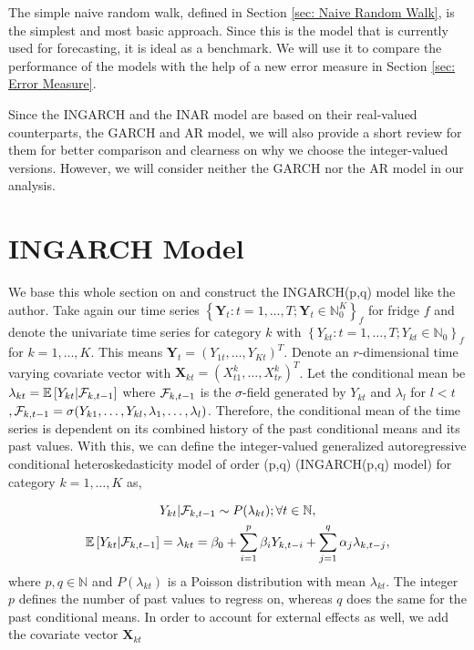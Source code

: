 The simple naive random walk, defined in Section \ref{sec: Naive Random Walk}, is the simplest and most basic approach. Since this is the model that is currently used for forecasting, it is ideal as a benchmark. We will use it to compare the performance of the models with the help of a new error measure in Section \ref{sec: Error Measure}. 

Since the INGARCH and the INAR model are based on their real-valued counterparts, the GARCH and AR model, we will also provide a short review for them for better comparison and clearness on why we choose the integer-valued versions. However, we will consider neither the GARCH nor the AR model in our analysis. 

\section{INGARCH Model}
\label{sec:Ingarch}

We base this whole section on \textcite{Liboschik:2016} and construct the INGARCH(p,q) model like the author. 
Take again our time series $\left\{\bm{Y}_t:t=1,\ldots,T; \bm{Y}_t \in \mathbb{N}_0^K \right\}_f$ for fridge $f$ and denote the univariate time series for category $k$ with $\left\{Y_{kt}:t=1,\ldots,T; Y_{kt} \in \mathbb{N}_0\right\}_f$  for $k=1,\ldots,K$. This means $\bm{Y}_t = (Y_{1t},\ldots,Y_{Kt})^T$. Denote an $r$-dimensional time varying covariate vector with $\textbf{X}_{kt}=(X_{t1}^k,\ldots,X_{tr}^k)^T$. Let the conditional mean be $\lambda_{kt} = \mathbb{E}\left[Y_{kt} | \mathcal{F}_{k,t-1} \right]$ where $\mathcal{F}_{k,t-1}$ is the $\sigma$-field generated by $Y_{kt}$ and $\lambda_l$ for $l<t$ $, \mathcal{F} _{k,t-1}= \sigma(Y_{k1},\ldots,Y_{kl},\lambda_1, \ldots, \lambda_l)$. Therefore, the conditional mean of the time series is dependent on its combined history of the past conditional means and its past values. With this, we can define the integer-valued generalized autoregressive conditional heteroskedasticity model of order (p,q) (INGARCH(p,q) model) for category $k=1,\ldots,K$ as,

\begin{equation}
\begin{gathered}
\label{eq:Ingarch model}
Y_{kt} | \mathcal{F}_{k,t-1} \sim P(\lambda_{kt}); \forall t \in \mathbb{N}, \\
\mathbb{E}\left[Y_{kt} | \mathcal{F}_{k,t-1} \right] = \lambda_{kt} = \beta_0 + \sum_{i=1}^p\beta_i Y_{k,t-i} + \sum_{j=1}^q\alpha_j \lambda_{k,t-j},
\end{gathered}
\end{equation}
%
where $p,q \in \mathbb{N}$ and $P(\lambda_{kt})$ is a Poisson distribution with mean $\lambda_{kt}$. The integer $p$ defines the number of past values to regress on, whereas $q$ does the same for the past conditional means. In order to account for external effects as well, we add the covariate vector $\textbf{X}_{kt}$

